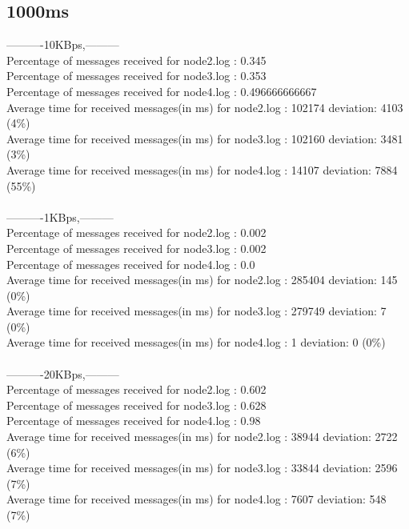     \subsection{1000ms}\label{RawResults:1000ms}
        ----------10KBps,---------\\
        Percentage of messages received for node2.log : 0.345\\
        Percentage of messages received for node3.log : 0.353\\
        Percentage of messages received for node4.log : 0.496666666667\\
        Average time for received messages(in ms) for  node2.log : 102174 	deviation: 4103 (4\%)\\
        Average time for received messages(in ms) for  node3.log : 102160 	deviation: 3481 (3\%)\\
        Average time for received messages(in ms) for  node4.log : 14107 	deviation: 7884 (55\%)\\\\
        ----------1KBps,---------\\
        Percentage of messages received for node2.log : 0.002\\
        Percentage of messages received for node3.log : 0.002\\
        Percentage of messages received for node4.log : 0.0\\
        Average time for received messages(in ms) for  node2.log : 285404 	deviation: 145 (0\%)\\
        Average time for received messages(in ms) for  node3.log : 279749 	deviation: 7 (0\%)\\
        Average time for received messages(in ms) for  node4.log : 1 	deviation: 0 (0\%)\\\\
        ----------20KBps,---------\\
        Percentage of messages received for node2.log : 0.602\\
        Percentage of messages received for node3.log : 0.628\\
        Percentage of messages received for node4.log : 0.98\\
        Average time for received messages(in ms) for  node2.log : 38944 	deviation: 2722 (6\%)\\
        Average time for received messages(in ms) for  node3.log : 33844 	deviation: 2596 (7\%)\\
        Average time for received messages(in ms) for  node4.log : 7607 	deviation: 548 (7\%)\\\\
